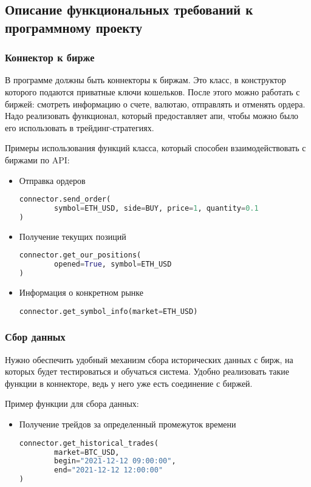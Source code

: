\subsection{Описание функциональных требований к программному проекту}

\subsubsection{Коннектор к бирже}

В программе должны быть коннекторы к биржам. Это класс, в конструктор которого подаются приватные ключи кошельков. После этого можно работать с биржей: смотреть информацию о счете, валютаю, отправлять и отменять ордера. Надо реализовать функционал, который предоставляет апи, чтобы можно было его использовать в трейдинг-стратегиях.

Примеры использования функций класса, который способен взаимодействовать с биржами по API:

\begin{itemize}

\item Отправка ордеров
\begin{lstlisting}[language=Python]
connector.send_order(
        symbol=ETH_USD, side=BUY, price=1, quantity=0.1
)
\end{lstlisting}

\item Получение текущих позиций
\begin{lstlisting}[language=Python]
connector.get_our_positions(
        opened=True, symbol=ETH_USD
)
\end{lstlisting}

\item Информация о конкретном рынке
\begin{lstlisting}[language=Python]
connector.get_symbol_info(market=ETH_USD)
\end{lstlisting}

\end{itemize}

\subsubsection{Сбор данных}
Нужно обеспечить удобный механизм сбора исторических данных с бирж, на которых будет тестироваться и обучаться система. Удобно реализовать такие функции в коннекторе, ведь у него уже есть соединение с биржей.

Пример функции для сбора данных:
\begin{itemize}
\item Получение трейдов за определенный промежуток времени
\begin{lstlisting}[language=Python]
connector.get_historical_trades(
        market=BTC_USD,
        begin="2021-12-12 09:00:00",
        end="2021-12-12 12:00:00"
)
\end{lstlisting}
\end{itemize}

